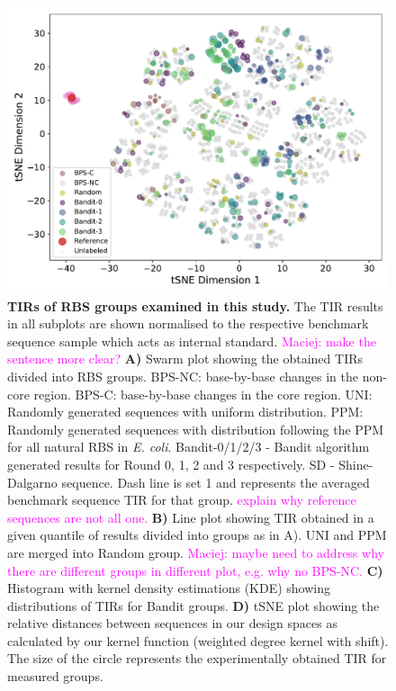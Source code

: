 \documentclass{article}
\newcommand{\mengyan}[1]{\textcolor{magenta}{#1}}
\begin{document}
\begin{figure}[!ht]
    \includegraphics[scale=0.4]{plots/Main_Paper/tsneplot.pdf}
    \caption{\textbf{TIRs of RBS groups examined in this study.} 
    The TIR results in all subplots are shown normalised to the respective benchmark sequence sample which acts as internal standard.
    \mengyan{Maciej: make the sentence more clear?}
    \textbf{A)} Swarm plot showing the obtained TIRs divided into RBS groups.
    BPS-NC: base-by-base changes in the non-core region. 
    BPS-C: base-by-base changes in the core region. 
    UNI: Randomly generated sequences with uniform distribution. 
    PPM: Randomly generated sequences with distribution following the PPM for all natural RBS in \emph{E. coli}. 
    Bandit-0/1/2/3 - Bandit algorithm generated results for Round 0, 1, 2 and 3 respectively. 
    SD - Shine-Dalgarno sequence. Dash line is set 1 and represents the averaged benchmark sequence TIR for that group. 
    \mengyan{explain why reference sequences are not all one.}
    \textbf{B)} Line plot showing TIR obtained in a given quantile of results divided into groups as in A).
    UNI and PPM are merged into Random group. 
    \mengyan{Maciej: maybe need to address why there are different groups in different plot, e.g. why no BPS-NC.}
    \textbf{C)} Histogram with kernel density estimations (KDE) showing distributions of TIRs for Bandit groups.
    \textbf{D)} tSNE plot showing the relative distances between sequences in our design spaces as calculated by our kernel function (weighted degree kernel with shift). The size of the circle represents the experimentally obtained TIR for measured groups.}
    \label{fig: Swarmplot and Quantplot}
\end{figure}
\end{document}
